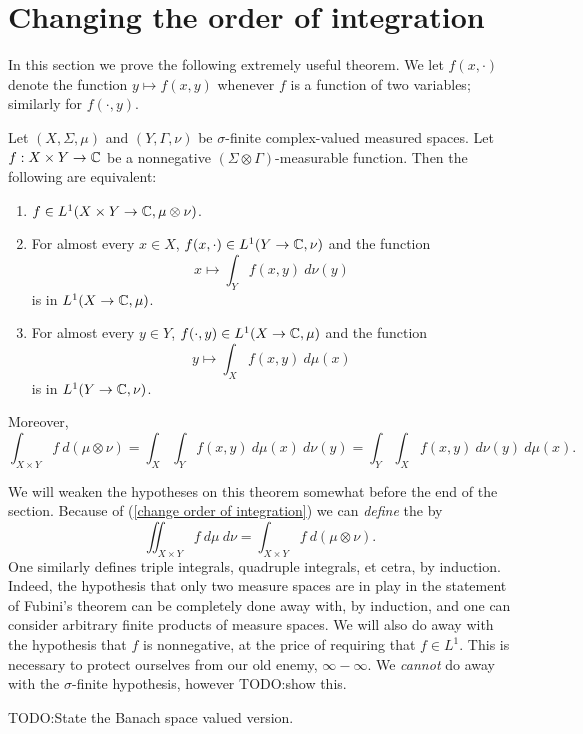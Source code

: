 \section{Changing the order of integration}
In this section we prove the following extremely useful theorem.
We let $f(x, \cdot)$ denote the function $y \mapsto f(x, y)$ whenever $f$ is a function of two variables; similarly for $f(\cdot, y)$.
\begin{theorem}[Fubini]
Let $(X, \Sigma, \mu)$ and $(Y, \Gamma, \nu)$ be $\sigma$-finite complex-valued measured spaces.
Let $f: X \times Y \to \mathbb{C}$ be a nonnegative $(\Sigma \otimes \Gamma)$-measurable function.
Then the following are equivalent:
\begin{enumerate}
\item $f \in L^{1}(X \times Y \to \mathbb{C}, \mu \otimes \nu)$.
\item For almost every $x \in X$, $f(x, \cdot) \in L^{1}(Y \to \mathbb{C}, \nu)$ and the function
\[x \mapsto \int_{Y} f(x, y)~d\nu(y)\]
is in $L^{1}(X \to \mathbb{C}, \mu)$.
\item For almost every $y \in Y$, $f(\cdot, y) \in L^{1}(X \to \mathbb{C}, \mu)$ and the function
\[y \mapsto \int_{X} f(x, y)~d\mu(x)\]
is in $L^{1}(Y \to \mathbb{C}, \nu)$.
\end{enumerate}
Moreover,
\begin{equation}\label{change order of integration}
\int_{X \times Y} f~d(\mu \otimes \nu) = \int_{X} \int_{Y} f(x, y) ~d\mu(x)~d\nu(y) = \int_{Y} \int_{X} f(x, y) ~d\nu(y) ~d\mu(x).
\end{equation}
\end{theorem}
We will weaken the hypotheses on this theorem somewhat before the end of the section.
Because of (\ref{change order of integration}) we can \emph{define} the  by
\[\iint_{X \times Y} f ~d\mu ~d\nu = \int_{X \times Y} f~d(\mu \otimes \nu).\]
One similarly defines triple integrals, quadruple integrals, et cetra, by induction.
Indeed, the hypothesis that only two measure spaces are in play in the statement of Fubini's theorem can be completely done away with, by induction, and one can consider arbitrary finite products of measure spaces.
We will also do away with the hypothesis that $f$ is nonnegative, at the price of requiring that $f \in L^{1}$.
This is necessary to protect ourselves from our old enemy, $\infty - \infty$.
We \emph{cannot} do away with the $\sigma$-finite hypothesis, however TODO:show this.

TODO:\@ State the Banach space valued version.

